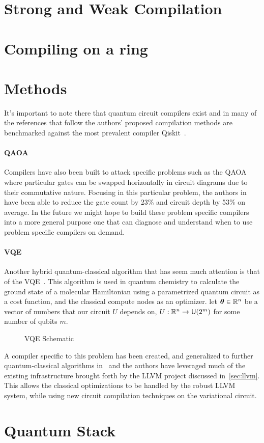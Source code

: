 \section{Strong and Weak Compilation}

\section{Compiling on a ring}

\section{Methods}

It's important to note there that quantum circuit compilers exist and in many of the references that follow the authors' proposed compilation methods are benchmarked against the most prevalent compiler Qiskit~\cite{qiskit}.

\paragraph{QAOA}
Compilers have also been built to attack specific problems such as the \ac{QAOA}~\cite{qaoa} where particular gates can be swapped horizontally in circuit diagrams due to their commutative nature.
Focusing in this particular problem, the authors in~\cite{qaoa-compiler} have been able to reduce the gate count by 23\% and circuit depth by 53\% on average.
In the future we might hope to build these problem specific compilers into a more general purpose one that can diagnose and understand when to use problem specific compilers on demand.

\paragraph{VQE}
Another hybrid quantum-classical algorithm that has seem much attention is that of the \ac{VQE}~\cite{vqe,vqe2}.
This algorithm is used in quantum chemistry to calculate the ground state of a molecular Hamiltonian using a parametrized quantum circuit as a cost function, and the classical compute nodes as an optimizer.
\Eg{} let $\boldsymbol{\theta} \in \mathbb{R}^n$ be a vector of numbers that our circuit $U$ depends on, \ie{} $U: \mathbb{R}^n \to \mathsf{U} (2^m)$ for some number of qubits $m$.
\begin{figure}[ht] %
    \centering
    
    \caption{\acs{VQE} Schematic}\label{fig:vqe}
\end{figure}
A compiler specific to this problem has been created, and generalized to further quantum-classical algorithms in~\cite{vqe-compiler} and the authors have leveraged much of the existing infrastructure brought forth by the LLVM project discussed in~\cref{sec:llvm}.
This allows the classical optimizations to be handled by the robust LLVM system, while using new circuit compilation techniques on the variational circuit.


\section{Quantum Stack}
